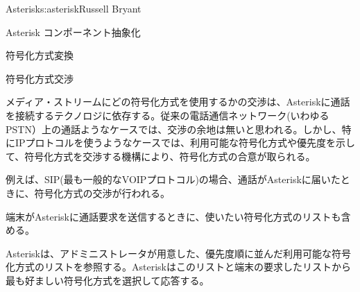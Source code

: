\begin{aosachapter}{Asterisk}{s:asterisk}{Russell Bryant}
\begin{aosasect1}{Asterisk コンポーネント抽象化}
\begin{aosasect2}{符号化方式変換}
\begin{aosabox}{符号化方式交渉}

メディア・ストリームにどの符号化方式を使用するかの交渉は、Asteriskに通話を接続するテクノロジに依存する。従来の電話通信ネットワーク(いわゆるPSTN）上の通話ようなケースでは、交渉の余地は無いと思われる。しかし、特にIPプロトコルを使うようなケースでは、利用可能な符号化方式や優先度を示して、符号化方式を交渉する機構により、符号化方式の合意が取られる。

例えば、SIP(最も一般的なVOIPプロトコル)の場合、通話がAsteriskに届いたときに、符号化方式の交渉が行われる。

\begin{aosaenumerate}

  \item 端末がAsteriskに通話要求を送信するときに、使いたい符号化方式のリストも含める。

  \item Asteriskは、アドミニストレータが用意した、優先度順に並んだ利用可能な符号化方式のリストを参照する。Asteriskはこのリストと端末の要求したリストから最も好ましい符号化方式を選択して応答する。

\end{aosaenumerate}


\end{aosabox}
\end{aosasect2}
\end{aosasect1}
\end{aosachapter}
